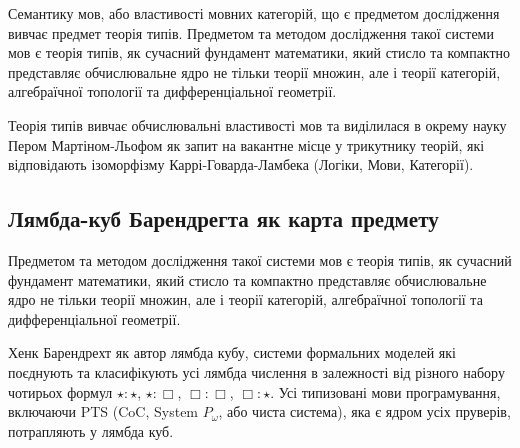 Семантику мов, або властивості мовних категорій, що є предметом
дослідження вивчає предмет теорія типів. Предметом та методом
дослідження такої системи мов є теорія типів, як сучасний фундамент
математики, який стисло та компактно представляє обчислювальне ядро
не тільки теорії множин, але і теорії категорій, алгебраїчної
топології та дифференціальної геометрії.

Теорія типів вивчає обчислювальні властивості мов та виділилася
в окрему науку Пером Мартіном-Льофом як запит на вакантне місце
у трикутнику теорій, які відповідають ізоморфізму
Каррі-Говарда-Ламбека (Логіки, Мови, Категорії).

\newpage
\subsection*{Лямбда-куб Барендрегта як карта предмету}
Предметом та методом дослідження такої системи мов є теорія типів,
як сучасний фундамент математики, який стисло та компактно представляє
обчислювальне ядро не тільки теорії множин,
але і теорії категорій, алгебраїчної топології та дифференціальної геометрії.

Хенк Барендрехт як автор лямбда кубу, системи формальних
моделей які поєднують та класифікують усі лямбда числення в
залежності від різного набору чотирьох формул $\star : \star$,
$\star : \Box$, $\Box : \Box$, $\Box : \star$. Усі типизовані мови
програмування, включаючи PTS (CoC, System $P_\omega$, або чиста система),
яка є ядром усіх пруверів, потрапляють у лямбда куб.

\begin{center}
\end{center}

